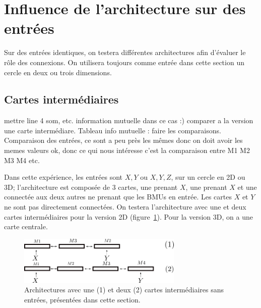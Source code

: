 \section{Influence de l'architecture sur des entrées}

Sur des entrées identiques, on testera différentes architectures afin d'évaluer le rôle des connexions. On utilisera toujours comme entrée dans cette section un cercle en deux ou trois dimensions. 


\subsection{Cartes intermédiaires}
mettre line 4 som, etc. 
information mutuelle dans ce cas :) comparer a la version une carte intermédiare. 
Tableau info mutuelle : faire les comparaisons. Comparaison des entrées, ce sont a peu près les mêmes donc on doit avoir les memes valeurs ok, donc ce qui nous intéresse c'est la comparaison entre M1 M2 M3 M4 etc. 

Dans cette expérience, les entrées sont $X,Y$ ou $X,Y,Z$, sur un cercle en 2D ou 3D; l'architecture est composée de 3 cartes, une prenant $X$, une prenant $X$ et une connectée aux deux autres ne prenant que les BMUs en entrée. Les cartes $X$ et $Y$ ne sont pas directement connectées. On testera l'architecture avec une et deux cartes intermédiaires pour la version 2D (figure~\ref{fig:archi_intermediaire}).
Pour la version 3D, on a une carte centrale. 

\begin{figure}[h!]
\includegraphics[width=0.7\textwidth]{archi_intermediaire.png}
\caption{Architectures avec une (1) et deux (2) cartes intermédiaires sans entrées, présentées dans cette section. }
\label{fig:archi_intermediaire}
\end{figure}

